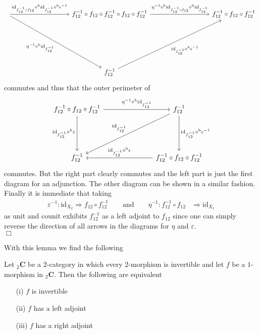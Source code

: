 \begin{prf}[Sketch]
\begin{equation*}
\begin{tikzcd}[row sep=7em,column sep=9em]
  \ar{r}{\mathrm{id}_{f_{12}^{-1} \circ f_{12}} \circ^{\mathrm{h}} \mathrm{id}_{f_{12}^{-1}} \circ^{\mathrm{h}} \epsilon^{-1}}
  \ar{rd}[swap]{\eta^{-1} \circ^{\mathrm{h}} \mathrm{id}_{f_{12}^{-1}}}
  &
  f_{12}^{-1}
  \circ
  f_{12}
  \circ
  f_{12}^{-1}
  \circ
  f_{12}
  \circ
  f_{12}^{-1}
  \ar{r}{\eta^{-1} \circ^{\mathrm{h}} \mathrm{id}_{f_{12}^{-1} \circ f_{12}} \circ^{\mathrm{h}} \mathrm{id}_{f_{12}^{-1}}}
  &
  f_{12}^{-1}
  \circ
  f_{12}
  \circ
  f_{12}^{-1}
  \\
  &
  f_{12}^{-1}
  \ar{ur}[swap]{\mathrm{id}_{f_{12}^{-1}} \circ^{\mathrm{h}} \epsilon^{-1}}
  &
\end{tikzcd}
\end{equation*}
commutes and thus that the outer perimeter of
\begin{equation*}
\begin{tikzcd}[row sep=5em,column sep=7em]
  f_{12}^{-1}
  \circ
  f_{12}
  \circ
  f_{12}^{-1}
  \ar{r}{\eta^{-1} \circ^{\mathrm{h}} \mathrm{id}_{f_{12}^{-1}}}
  \ar{d}[swap]{\mathrm{id}_{f_{12}^{-1}} \circ^{\mathrm{h}}\varepsilon}
  &
  f_{12}^{-1}
  \ar{d}{\mathrm{id}_{f_{12}^{-1}} \circ^{\mathrm{h}} \epsilon^{-1}}
  \ar{dl}[swap]{\mathrm{id}_{f_{12}^{-1}}}
  \\
  f_{12}^{-1}
  &
  f_{12}^{-1}
  \circ
  f_{12}
  \circ
  f_{12}^{-1}
  \ar{l}[swap]{\mathrm{id}_{f_{12}^{-1}} \circ^{\mathrm{h}} \epsilon}
\end{tikzcd}
\end{equation*}
commutes. But the right part clearly commutes and the left part is just the first diagram for an adjunction. The other diagram can be shown in a similar fashion.
\\
Finally it is immediate that taking
\begin{align*}
  \varepsilon^{-1}
  \colon
  \mathrm{id}_{X_{2}}
  \Rightarrow
  f_{12}
  \circ
  f_{12}^{-1}
  \qquad
  \text{and}
  \qquad
  \eta^{-1}
  \colon
  f_{12}^{-1}
  \circ
  f_{12}
  &\Rightarrow
  \mathrm{id}_{X_{1}}
\end{align*}
as unit and counit exhibits $f_{12}^{-1}$ as a left adjoint to $f_{12}$ since one can simply reverse the direction of all arrows in the diagrams for $\eta$ and $\varepsilon$.
\\
\phantom{proven}
\hfill
$\Box$
\end{prf}
With this lemma we find the following
\\
\begin{cor}
\label{cor:invadj}
Let ${_{2}}\mathbf{C}$ be a $2$-category in which every $2$-morphism is invertible and let $f$ be a $1$-morphism in ${_{2}}\mathbf{C}$. Then the following are equivalent
\begin{enumerate}
\item[(i)]
$f$ is invertible

\item[(ii)]
$f$ has a left adjoint

\item[(iii)]
$f$ has a right adjoint
\end{enumerate}
\end{cor}
